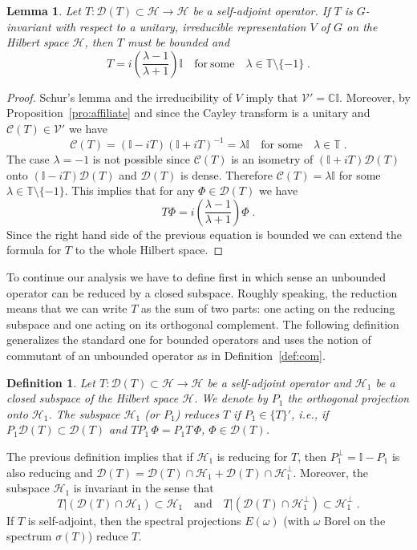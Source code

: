 \documentclass[a4paper,12pt]{amsart}
\renewcommand{\H}{\mathcal{H}}
\newcommand{\D}{\mathcal{D}}
\newcommand{\1}{\mathbb{I}}
\newtheorem{definition}[theorem]{Definition}
\newtheorem{lemma}[theorem]{Lemma}
\numberwithin{equation}{section}
\numberwithin{theorem}{section}
\begin{document}
\begin{lemma}\label{lem:irrep}
Let $T\colon\mathcal{D}(T)\subset\mathcal{H}\to \H$ be a self-adjoint operator. If $T$ is 
$G$-invariant with respect to a unitary, irreducible representation $V$ of $G$ on the Hilbert
space $\mathcal{H}$, then $T$ must be bounded and
\[
 T=i\left(\frac{\lambda-1}{\lambda+1}\right)\1\quad\mathrm{for~some}\quad \lambda\in\mathbb{T}\setminus \{-1\}\;.
\]
\end{lemma}
\begin{proof}
Schur's lemma and the irreducibility of $V$ imply that $\mathcal{V}'=\mathbb{C}\1$. 
Moreover, by Proposition~\ref{pro:affiliate} and since the Cayley transform is a unitary and
$\mathcal{C}(T)\in\mathcal{V}'$ we have
\[
 \mathcal{C}(T)=(\1-iT)(\1+iT)^{-1}=\lambda\1\quad\textrm{for~some}\quad \lambda\in\mathbb{T}\;.
\]
The case $\lambda=-1$ is not possible since $\mathcal{C}(T)$ is an isometry of $(\1+iT)\mathcal{D}(T)$
onto $(\1-iT)\mathcal{D}(T)$ and $\mathcal{D}(T)$ is dense. Therefore $\mathcal{C}(T)=\lambda\1$
for some $\lambda\in\mathbb{T}\setminus \{-1\}$.
This implies that for any $\Phi\in\mathcal{D}(T)$ we have
\[
 T\Phi=i\left(\frac{\lambda-1}{\lambda+1}\right) \Phi\;.
\]
Since the right hand side of the previous equation is bounded we can extend
the formula for $T$ to the whole Hilbert space.
\end{proof}

To continue our analysis we have to define first in which sense an unbounded operator can 
be reduced by a closed subspace.
Roughly speaking, the reduction means that we can write $T$ as the sum of two
parts: one acting on the reducing subspace and one acting on its orthogonal complement.
The following definition generalizes the standard one for bounded operators and uses the 
notion of commutant of an unbounded operator as in Definition~\ref{def:com}.

\begin{definition}
Let $T\colon\mathcal{D}(T)\subset\mathcal{H}\to \H$ be a self-adjoint operator and
$\H_1$ be a closed subspace of the Hilbert space $\H$. We denote by $P_1$ the orthogonal projection
onto $\H_1$. The subspace $\H_1$ (or $P_1$) reduces $T$ if $P_1\in\{T\}'$, i.e., if
$P_1\D(T)\subset\D(T)$ and $TP_1\,\Phi= P_1T\,\Phi$, $\Phi\in\D(T)$.
\end{definition}

The previous definition implies that if $\H_1$ is reducing for $T$, then $P_1^\perp=\1-P_1$ is also 
reducing and $\D(T)=\D(T)\cap\H_1+\D(T)\cap\H_1^\perp$. Moreover, the subspace $\H_1$ is invariant in the sense that
\[
 T|(\D(T)\cap\H_1)\subset \H_1\quad\mathrm{and}\quad T|(\D(T)\cap\H_1^\perp)\subset \H_1^\perp\;.
\]
If $T$ is self-adjoint, then the spectral projections $E(\omega)$ (with $\omega$ Borel on 
the spectrum $\sigma(T)$) reduce $T$.
\end{document}
